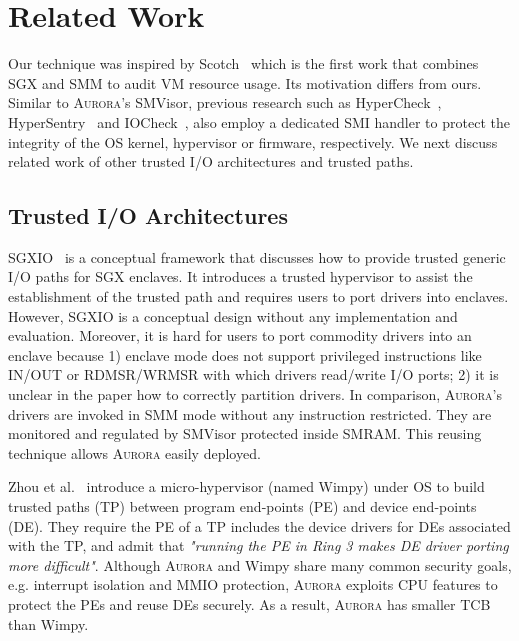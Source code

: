 \section{Related Work}
Our technique was inspired by Scotch~\cite{DBLP:conf/raid/LeachZW17} which is the first work that combines SGX and SMM to audit VM resource usage. Its motivation differs from ours.
Similar to \textsc{Aurora}'s SMVisor, previous research such as HyperCheck~\cite{DBLP:conf/raid/WangSG10}, HyperSentry~\cite{DBLP:conf/ccs/AzabNWJZS10} and IOCheck~\cite{DBLP:conf/esorics/ZhangWLS14}, also employ a dedicated SMI handler to protect the integrity of the OS kernel, hypervisor or firmware, respectively.
We next discuss related work of other trusted I/O architectures and trusted paths.

\subsection{Trusted I/O Architectures}

SGXIO~\cite{weiser_sgxio:_2017} is a conceptual framework that discusses how to provide trusted generic I/O paths for SGX enclaves. It introduces a trusted hypervisor to assist the establishment of the trusted path and requires users to port drivers into enclaves. However, SGXIO is a conceptual design without any implementation and evaluation. Moreover, it is hard for users to port commodity drivers into an enclave because 1) enclave mode does not support privileged instructions like \textsf{IN/OUT} or \textsf{RDMSR/WRMSR} with which drivers read/write I/O ports; 2) it is unclear in the paper \cite{weiser_sgxio:_2017} how to correctly partition drivers. In comparison, \textsc{Aurora}'s drivers are invoked in SMM mode without any instruction restricted. They are monitored and regulated by SMVisor protected inside SMRAM. This reusing technique allows \textsc{Aurora} easily deployed.

Zhou et al.~\cite{zhou_dancing_2014} introduce a micro-hypervisor (named Wimpy) under OS to build trusted paths (TP) between program end-points (PE) and device end-points (DE). They require the PE of a TP includes the device drivers for DEs associated with the TP, and admit that \textit{"running the PE in Ring 3 makes DE driver porting more difficult"}.  Although \textsc{Aurora} and Wimpy share many common security goals, e.g. interrupt isolation and MMIO protection, \textsc{Aurora} exploits CPU features to protect the PEs and reuse DEs securely. As a result, \textsc{Aurora} has smaller TCB than Wimpy. 

